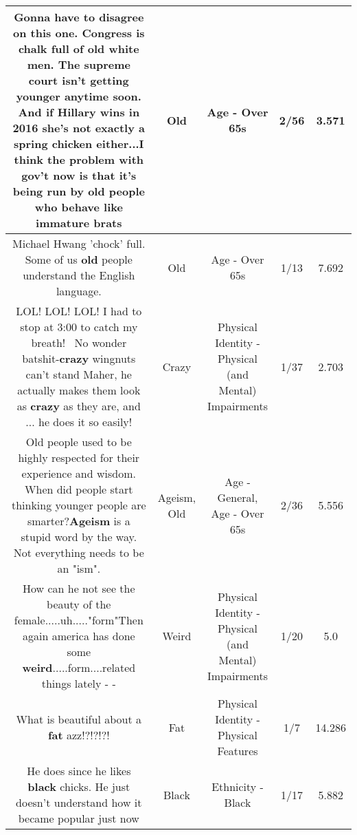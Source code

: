 \documentclass[11pt]{article}
\newlength\mylength
\begin{document}
\begin{center}
\begin{longtable}{|C{.65\mylength}|C{.30\mylength}|C{.12\mylength}|C{.12\mylength}|C{.12\mylength}|}
  \small Gonna have to disagree on this one. Congress is chalk full of \textbf{old} white men. The supreme court isn't getting younger anytime soon. And if Hillary wins in 2016 she's not exactly a spring chicken either...I think the problem with gov't now is that it's being run by \textbf{old} people who behave like immature brats\normalsize   & Old & Age - Over 65s & 2/56 & 3.571 \\  \hline
  \small Michael Hwang 'chock' full. Some of us \textbf{old} people understand the English language.\normalsize   & Old & Age - Over 65s & 1/13 & 7.692 \\  \hline
  \small LOL! LOL! LOL! I had to stop at \@3:00 to catch my breath!  No wonder batshit-\textbf{crazy} wingnuts can't stand Maher, he actually makes them look as \textbf{crazy} as they are, and ... he does it so easily!\normalsize   & Crazy & Physical Identity - Physical (and Mental) Impairments & 1/37 & 2.703 \\  \hline
  \small Old people used to be highly respected for their experience and wisdom. When did people start thinking younger people are smarter?\textbf{Ageism} is a stupid word by the way. Not everything needs to be an "ism".\normalsize   & Ageism, Old & Age - General, Age - Over 65s & 2/36 & 5.556 \\  \hline
  \small How can he not see the beauty of the female.....uh....."form"Then again america has done some \textbf{weird}.....form....related things lately - -\normalsize   & Weird & Physical Identity - Physical (and Mental) Impairments & 1/20 & 5.0 \\  \hline
  \small What is beautiful about a \textbf{fat} azz!?!?!?!\normalsize   & Fat & Physical Identity - Physical Features & 1/7 & 14.286 \\  \hline
  \small He does since he likes \textbf{black} chicks. He just doesn't understand how it became popular just now\normalsize   & Black & Ethnicity - Black & 1/17 & 5.882 \\  \hline

\end{longtable}
\end{center}
\end{document}
